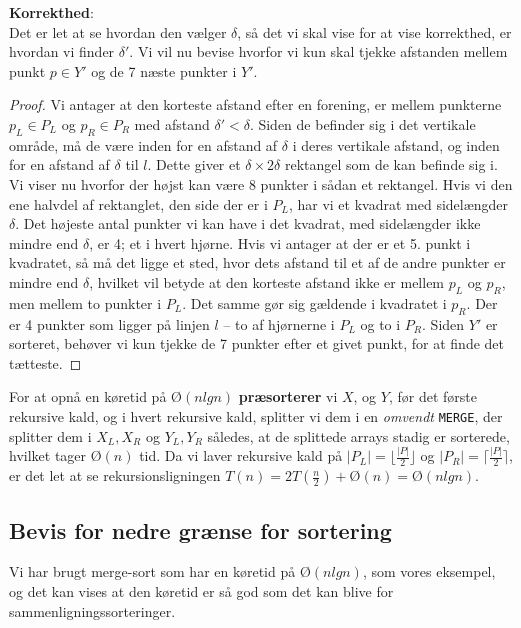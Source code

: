 \textbf{Korrekthed}:\\
Det er let at se hvordan den vælger $\delta$, så det vi skal vise for at vise korrekthed, er hvordan vi finder $\delta'$. Vi vil nu bevise hvorfor vi kun skal tjekke afstanden mellem punkt $p \in Y'$ og de 7 næste punkter i $Y'$.\\
\begin{proof}
  Vi antager at den korteste afstand efter en forening, er mellem punkterne $p_L \in P_L$ og $p_R \in P_R$ med afstand $\delta' < \delta$. Siden de befinder sig i det vertikale område, må de være inden for en afstand af $\delta$ i deres vertikale afstand, og inden for en afstand af $\delta$ til $l$. Dette giver et $\delta \times 2\delta$ rektangel som de kan befinde sig i.\\
  
  Vi viser nu hvorfor der højst kan være 8 punkter i sådan et rektangel. Hvis vi den ene halvdel af rektanglet, den side der er i $P_L$, har vi et kvadrat med sidelængder $\delta$. Det højeste antal punkter vi kan have i det kvadrat, med sidelængder ikke mindre end $\delta$, er 4; et i hvert hjørne. Hvis vi antager at der er et 5. punkt i kvadratet, så må det ligge et sted, hvor dets afstand til et af de andre punkter er mindre end $\delta$, hvilket vil betyde at den korteste afstand ikke er mellem $p_L$ og $p_R$, men mellem to punkter i $P_L$. Det samme gør sig gældende i kvadratet i $p_R$. Der er 4 punkter som ligger på linjen $l$ -- to af hjørnerne i $P_L$ og to i $P_R$. Siden $Y'$ er sorteret, behøver vi kun tjekke de 7 punkter efter et givet punkt, for at finde det tætteste.
\end{proof}

For at opnå en køretid på $Ø(nlgn)$ \textbf{præsorterer} vi $X$, og $Y$, før det første rekursive kald, og i hvert rekursive kald, splitter vi dem i en \emph{omvendt} \texttt{MERGE}, der splitter dem i $X_L, X_R$ og $Y_L, Y_R$ således, at de splittede arrays stadig er sorterede, hvilket tager $Ø(n)$ tid. Da vi laver rekursive kald på $|P_L| = \lfloor \frac{|P|}{2}\rfloor$ og $|P_R| = \lceil \frac{|P|}{2}\rceil$, er det let at se rekursionsligningen $T(n) = 2T(\frac{n}{2}) + Ø(n) = Ø(nlgn)$.

\subsection{Bevis for nedre grænse for sortering}
Vi har brugt merge-sort som har en køretid på $Ø(nlgn)$, som vores eksempel, og det kan vises at den køretid er så god som det kan blive for sammenligningssorteringer.\\

